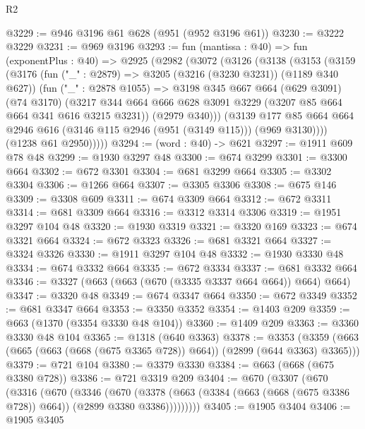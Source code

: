 \begin{lexlean}{R2}
\begin{coremodule}
@3229 := @946 @3196 @61 @628 (@951 (@952 @3196 @61))
@3230 := @3222 @3229
@3231 := @969 @3196
@3293 := fun (mantissa : @40) =>
  fun (exponentPlus : @40) =>
  @2925
    (@2982
      (@3072
        (@3126
          (@3138
            (@3153
              (@3159
                (@3176
                  (fun ("_" : @2879) => @3205 (@3216 (@3230 @3231)) (@1189 @340 @627))
                  (fun ("_" : @2878 @1055) =>
                  @3198
                    @345
                    @667
                    @664
                    (@629 @3091)
                    (@74 @3170)
                    (@3217
                      @344
                      @664
                      @666
                      @628
                      @3091
                      @3229
                      (@3207 @85 @664 @664 @341 @616 @3215 @3231))
                    (@2979 @340)))
                (@3139
                  @177
                  @85
                  @664
                  @664
                  @2946
                  @616
                  (@3146 @115 @2946 (@951 (@3149 @115)))
                  (@969 @3130))))
            (@1238 @61 @2950)))))
@3294 := (word : @40) -> @621
@3297 := @1911 @609 @78 @48
@3299 := @1930 @3297 @48
@3300 := @674 @3299
@3301 := @3300 @664
@3302 := @672 @3301
@3304 := @681 @3299 @664
@3305 := @3302 @3304
@3306 := @1266 @664
@3307 := @3305 @3306
@3308 := @675 @146
@3309 := @3308 @609
@3311 := @674 @3309 @664
@3312 := @672 @3311
@3314 := @681 @3309 @664
@3316 := @3312 @3314 @3306
@3319 := @1951 @3297 @104 @48
@3320 := @1930 @3319
@3321 := @3320 @169
@3323 := @674 @3321 @664
@3324 := @672 @3323
@3326 := @681 @3321 @664
@3327 := @3324 @3326
@3330 := @1911 @3297 @104 @48
@3332 := @1930 @3330 @48
@3334 := @674 @3332 @664
@3335 := @672 @3334
@3337 := @681 @3332 @664
@3346 := @3327 (@663 (@663 (@670 (@3335 @3337 @664 @664)) @664) @664)
@3347 := @3320 @48
@3349 := @674 @3347 @664
@3350 := @672 @3349
@3352 := @681 @3347 @664
@3353 := @3350 @3352
@3354 := @1403 @209
@3359 := @663 (@1370 (@3354 @3330 @48 @104))
@3360 := @1409 @209
@3363 := @3360 @3330 @48 @104
@3365 := @1318 (@640 @3363)
@3378 := @3353 (@3359 (@663 (@665 (@663 (@668 (@675 @3365 @728)) @664)) (@2899 (@644 @3363) @3365)))
@3379 := @721 @104
@3380 := @3379 @3330
@3384 := @663 (@668 (@675 @3380 @728))
@3386 := @721 @3319 @209
@3404 := @670
    (@3307
      (@670
        (@3316
          (@670
            (@3346
              (@670
                (@3378
                  (@663 (@3384 (@663 (@668 (@675 @3386 @728)) @664)) (@2899 @3380 @3386)))))))))
@3405 := @1905 @3404
@3406 := @1905 @3405

\end{coremodule}
\end{lexlean}
